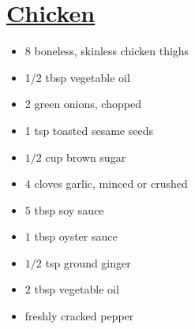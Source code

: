 
\RequirePackage{../recipe}






\begin{minipage}{\textwidth}
\vspace{-1em}
\thispagestyle{firstpage}
\section*{\underline{Chicken}}
\ingredients
\vspace{-1em}
\begin{multicols*}{2}
\begin{minipage}{\linewidth}
\ingredients[Chicken]
\vspace{-1em}
\begin{itemize}
    \item 8 boneless, skinless chicken thighs
    \item 1/2 tbsp vegetable oil
\end{itemize}
\end{minipage}

\columnbreak
\begin{minipage}{\linewidth}
\ingredients[Garnish]
\vspace{-1em}
\begin{itemize}
    \item 2 green onions, chopped
    \item 1 tsp toasted sesame seeds
\end{itemize}
\end{minipage}
\end{multicols*}
\vspace{-1em}
\begin{multicols*}{2}
\begin{minipage}{\linewidth}
\ingredients[Marinade]
\vspace{-1em}
\begin{itemize}
    \item $1/2$ cup brown sugar
    \item $4$ cloves garlic, minced or crushed
    \item $5$ tbsp soy sauce
    \item $1$ tbsp oyster sauce
    \item $1/2$ tsp ground ginger
    \item $2$ tbsp vegetable oil
    \item freshly cracked pepper
\end{itemize}
\vspace{1em}
\end{minipage}


\end{multicols*}
\end{minipage}
